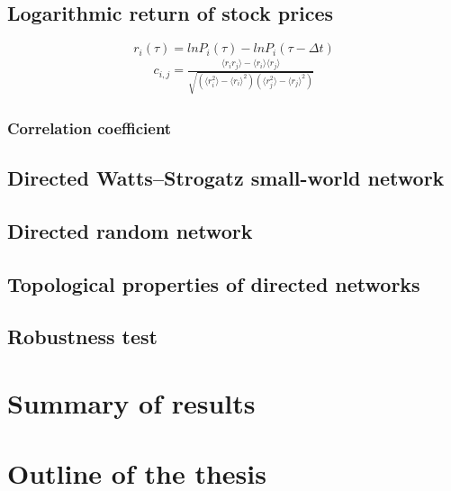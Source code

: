 \subsection{Logarithmic return of stock prices}
$$r_i(\tau)=lnP_i(\tau)-lnP_i(\tau-\Delta t)$$
\begin{eqnarray}\label{equ:corr}
c_{i,j}=\frac{\langle r_ir_j \rangle-\langle r_i\rangle \langle r_j\rangle}{\sqrt{(\langle r_i^2\rangle-\langle r_i\rangle^2)(\langle r_j^2\rangle-\langle r_j\rangle^2)}}
\end{eqnarray}
\subsubsection{Correlation coefficient}


\subsection{Directed Watts–Strogatz small-world network}



\subsection{Directed random network}

\subsection{Topological properties of directed networks}
\label{sec:aim}


\subsection{Robustness test}

\section{Summary of results}

\section{Outline of the thesis}

